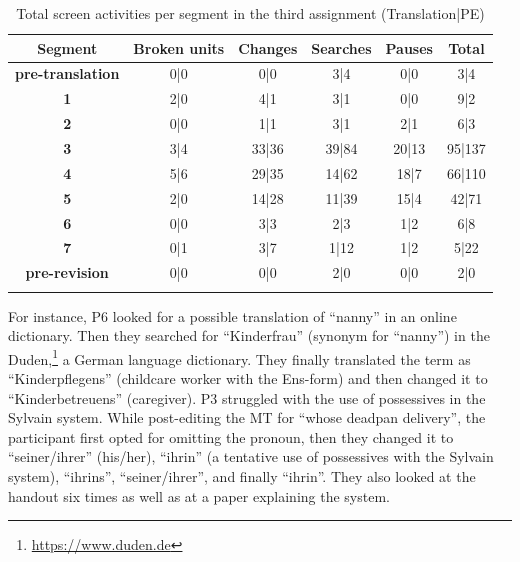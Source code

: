 \begin{table}[ht]
    \caption[Total of screen activities per segment in the third assignment]{Total screen activities per segment in the third assignment (Translation|PE)}
    \centering
    \begin{tabular}{cccccc} \lsptoprule
        \textbf{Segment} & \textbf{Broken units} & \textbf{Changes} & \textbf{Searches} & \textbf{Pauses} & \textbf{Total}\\
\midrule
        \textbf{pre-translation} & 0|0 & 0|0 & 3|4 & 0|0 & 3|4 \\
        \textbf{1} & 2|0 & 4|1 & 3|1 & 0|0 & 9|2 \\
        \textbf{2} & 0|0 & 1|1 & 3|1 & 2|1 & 6|3 \\
        \textbf{3} & 3|4 & \cellcolor{red!25}33|36 & \cellcolor{red!25}39|84 & \cellcolor{red!25}20|13 & \cellcolor{red!25}95|137 \\
        \textbf{4} & \cellcolor{red!25}5|6 & \cellcolor{red!25}29|35 & \cellcolor{red!25}14|62 & \cellcolor{red!25}18|7 & \cellcolor{red!25}66|110 \\
        \textbf{5} & 2|0 & \cellcolor{red!25}14|28 & \cellcolor{red!25}11|39 & \cellcolor{red!25}15|4 & \cellcolor{red!25}42|71 \\
        \textbf{6} & 0|0 & 3|3 & 2|3 & 1|2 & 6|8 \\
        \textbf{7} & 0|1 & 3|7 & 1|12 & 1|2 & 5|22 \\
        \textbf{pre-revision} & 0|0 & 0|0 & 2|0 & 0|0 & 2|0 \\
\lspbottomrule
    \end{tabular}
    \label{tab:technicaleffort_segment_third}
\end{table}

For instance, P6 looked for a possible translation of ``nanny'' in an online dictionary. Then they searched for ``Kinderfrau'' (synonym for ``nanny'') in the Duden,\footnote{\url{https://www.duden.de}} a German language dictionary. They finally translated the term as ``Kinderpflegens'' (childcare worker with the Ens-form) and then changed it to ``Kinderbetreuens'' (caregiver). P3 struggled with the use of possessives in the Sylvain system. While post-editing the MT for ``whose deadpan delivery'', the participant first opted for omitting the pronoun, then they changed it to ``seiner/ihrer'' (his/her), ``ihrin'' (a tentative use of possessives with the Sylvain system), ``ihrins'', ``seiner/ihrer'', and finally ``ihrin''. They also looked at the handout six times as well as at a paper explaining the system. 

